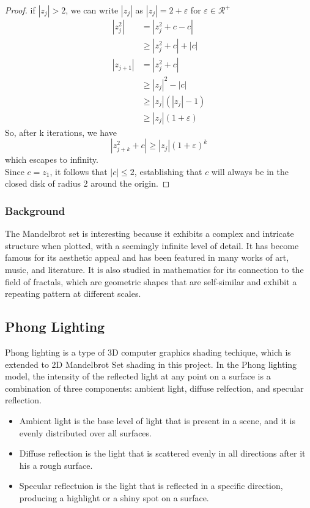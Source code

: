 \documentclass{article}
\begin{document}
        \begin{proof}
        	if $|z_j|>2$, we can write $|z_j|$ as $|z_j|=2+\varepsilon$ for $\varepsilon \in \mathcal{R}^+$\\
        	$$\begin{aligned}
        		|z_j^2|&=|z_j^2+c-c|\\
        			&\geq|z_j^2+c|+|c|\\
        		|z_{j+1}|&=|z_j^2+c|\\
        		&\geq |z_j|^2-|c|\\
        		&\geq |z_j|(|z_j|-1)\\
        		&\geq |z_j|(1+\varepsilon)
        	\end{aligned}$$
        	So, after k iterations, we have $$|z_{j+k}^2+c|\geq |z_j|(1+\varepsilon)^k$$
        	which escapes to infinity.\\
        	Since $c=z_{1}$, it follows that $|c|\leq 2$, establishing that $c$ will always be in 
        	the closed disk of radius 2 around the origin.
        \end{proof}
        
        \subsubsection{Background}
            
        The Mandelbrot set is interesting because it exhibits a complex and intricate structure when plotted, with a seemingly infinite level of detail. It has become famous for its aesthetic appeal and has been featured in many works of art, music, and literature. It is also studied in mathematics for its connection to the field of fractals, which are geometric shapes that are self-similar and exhibit a repeating pattern at different scales.

    \subsection{Phong Lighting}
        Phong lighting is a type of 3D computer graphics shading techique, which is extended to 2D Mandelbrot Set shading in this project. In the Phong lighting model, the intensity of the reflected light at any point on a surface is a combination of three components: ambient light, diffuse relfection, and specular reflection.

        \begin{itemize}
            \item Ambient light is the base level of light that is present in a scene, and it is evenly distributed over all surfaces.
            \item Diffuse reflection is the light that is scattered evenly in all directions after it his a rough surface.
            \item Specular reflectuion is the light that is reflected in a specific direction, producing a highlight or a shiny spot on a surface.
        \end{itemize}
\end{document}
